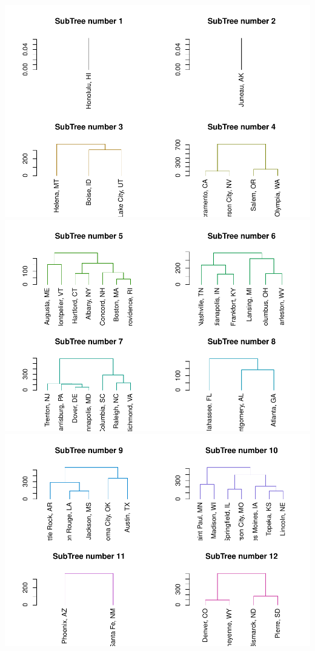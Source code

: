 \documentclass[
]{article}
\begin{document}
\includegraphics{graphics/chunk-distances-hclust-euclidean-sub-2.pdf}
\includegraphics{graphics/chunk-distances-hclust-euclidean-sub-3.pdf}
\includegraphics{graphics/chunk-distances-hclust-euclidean-sub-4.pdf}
\end{document}
